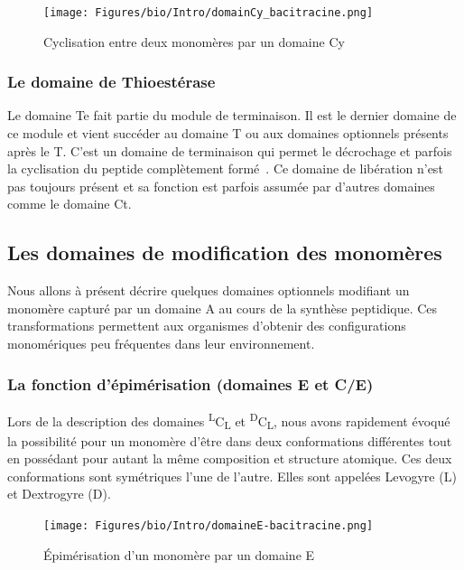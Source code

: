 \begin{figure}[h!]
  \begin{center}
    \texttt{[image: Figures/bio/Intro/domainCy\_bacitracine.png]}
    \caption{\label{domaine_Cy}Cyclisation entre deux monomères par un domaine Cy}
  \end{center}
\end{figure}


\subsubsection{Le domaine de Thioestérase}

Le domaine Te fait partie du module de terminaison.
Il est le dernier domaine de ce module et vient succéder au domaine T ou aux domaines optionnels présents après le T.
C'est un domaine de terminaison qui permet le décrochage et parfois la cyclisation du peptide complètement formé~\cite{trauger_peptide_2000,kohli_thioesterase_2002}.
Ce domaine de libération n'est pas toujours présent et sa fonction est parfois assumée par d'autres domaines comme le domaine Ct.


\subsection{Les domaines de modification des monomères}

\label{mono_modifs}

Nous allons à présent décrire quelques domaines optionnels modifiant un monomère capturé par un domaine A au cours de la synthèse peptidique.
Ces transformations permettent aux organismes d'obtenir des configurations monomériques peu fréquentes dans leur environnement.


\subsubsection{La fonction d'épimérisation (domaines E et C/E)}
\label{epimeri}

Lors de la description des domaines \textsuperscript{L}C\textsubscript{L} et \textsuperscript{D}C\textsubscript{L}, nous avons rapidement évoqué la possibilité pour un monomère d'être dans deux conformations différentes tout en possédant pour autant la même composition et structure atomique.
Ces deux conformations sont symétriques l'une de l'autre.
Elles sont appelées Levogyre (L) et Dextrogyre (D).

\begin{figure}[h!]
  \begin{center}
    \texttt{[image: Figures/bio/Intro/domaineE-bacitracine.png]}
    \caption{\label{domaine_E}Épimérisation d'un monomère par un domaine E}
  \end{center}
\end{figure}

